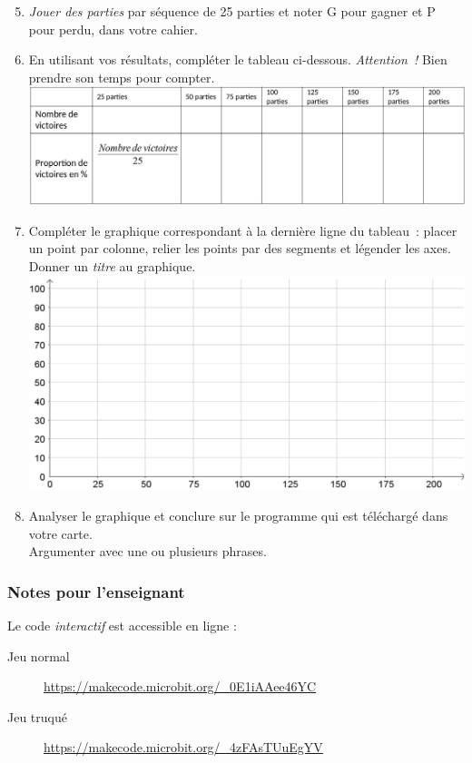 \begin{eleve}
    \begin{enumerate}
        \setcounter{enumi}{4}
        \item \emph{Jouer des parties} par séquence de 25 parties et noter G pour gagner et P pour perdu, dans votre cahier.
        \item En utilisant vos résultats, compléter le tableau ci-dessous. \emph{Attention !} Bien prendre son temps pour compter.\\
        \includegraphics[width=\linewidth]{res/mb-truque-activite2.png}
        \item Compléter le graphique correspondant à la dernière ligne du tableau : placer un point par colonne, relier les points par des segments et légender les axes.\\
        Donner un \emph{titre} au graphique.\\
          \includegraphics[width=\linewidth]{res/mb-truque-activite3.png}
        \item Analyser le graphique et conclure sur le programme qui est téléchargé dans votre carte.\\
        Argumenter avec une ou plusieurs phrases.
    \end{enumerate}
    
\end{eleve}



\subsubsection{Notes pour l'enseignant}

\begin{remarque}
    Le code \emph{interactif} est accessible en ligne : 
    \begin{description}
        \item[Jeu normal] \url{https://makecode.microbit.org/_0E1iAAee46YC}
        \item[Jeu truqué] \url{https://makecode.microbit.org/_4zFAsTUuEgYV}
    \end{description}
\end{remarque}